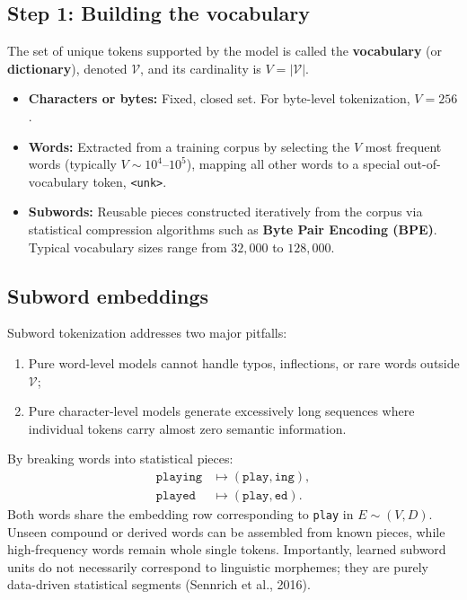 \documentclass[11pt,a4paper]{article}
\newcommand{\slides}[1]{\par\nopagebreak\noindent{\normalfont\small\emph{(slides #1)}}\par\nopagebreak\vspace{2pt}}
\theoremstyle{definition}
\theoremstyle{plain}
\begin{document}
\subsection{Step 1: Building the vocabulary}\slides{4 / 84}
The set of unique tokens supported by the model is called the \textbf{vocabulary} (or \textbf{dictionary}), denoted $\mathcal{V}$, and its cardinality is $V = |\mathcal{V}|$.
\begin{itemize}
\item \textbf{Characters or bytes:} Fixed, closed set. For byte-level tokenization, $V = 256$.
\item \textbf{Words:} Extracted from a training corpus by selecting the $V$ most frequent words (typically $V \sim 10^4\text{--}10^5$), mapping all other words to a special out-of-vocabulary token, \texttt{<unk>}.
\item \textbf{Subwords:} Reusable pieces constructed iteratively from the corpus via statistical compression algorithms such as \textbf{Byte Pair Encoding (BPE)}. Typical vocabulary sizes range from $32{,}000$ to $128{,}000$.
\end{itemize}

\subsection{Subword embeddings}\slides{5 / 84}
Subword tokenization addresses two major pitfalls:
\begin{enumerate}[nosep]
\item Pure word-level models cannot handle typos, inflections, or rare words outside $\mathcal{V}$;
\item Pure character-level models generate excessively long sequences where individual tokens carry almost zero semantic information.
\end{enumerate}
By breaking words into statistical pieces:
\begin{equation}
\begin{aligned}
\texttt{playing} &\longmapsto (\texttt{play}, \texttt{ing}), \\
\texttt{played} &\longmapsto (\texttt{play}, \texttt{ed}).
\end{aligned}
\end{equation}
Both words share the embedding row corresponding to \texttt{play} in $E \sim (V, D)$. Unseen compound or derived words can be assembled from known pieces, while high-frequency words remain whole single tokens. Importantly, learned subword units do not necessarily correspond to linguistic morphemes; they are purely data-driven statistical segments (Sennrich et al., 2016).
\end{document}
